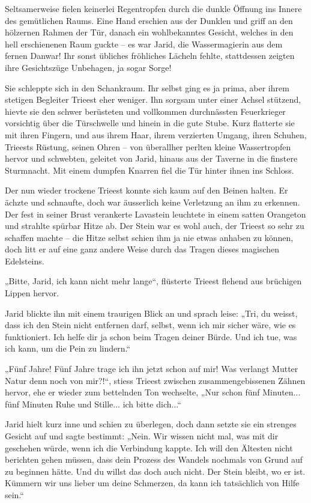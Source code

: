 Seltsamerweise fielen keinerlei Regentropfen durch die dunkle Öffnung ins Innere des gemütlichen Raums. Eine Hand erschien aus der Dunklen und griff an den hölzernen Rahmen der Tür, danach ein wohlbekanntes Gesicht, welches in den hell erschienenen Raum guckte – es war Jarid, die Wassermagierin aus dem fernen Danwar! Ihr sonst übliches fröhliches Lächeln fehlte, stattdessen zeigten ihre Gesichtszüge Unbehagen, ja sogar Sorge!

Sie schleppte sich in den Schankraum. Ihr selbst ging es ja prima, aber ihrem stetigen Begleiter Trieest eher weniger. Ihn sorgsam unter einer Achsel stützend, hievte sie den schwer berüsteten und vollkommen durchnässten Feuerkrieger vorsichtig über die Türschwelle und hinein in die gute Stube. Kurz flatterte sie mit ihren Fingern, und aus ihrem Haar, ihrem verzierten Umgang, ihren Schuhen, Trieests Rüstung, seinen Ohren – von überallher perlten kleine Wassertropfen hervor und schwebten, geleitet von Jarid, hinaus aus der Taverne in die finstere Sturmnacht. Mit einem dumpfen Knarren fiel die Tür hinter ihnen ins Schloss.

Der nun wieder trockene Trieest konnte sich kaum auf den Beinen halten. Er ächzte und schnaufte, doch war äusserlich keine Verletzung an ihm zu erkennen. Der fest in seiner Brust verankerte Lavastein leuchtete in einem satten Orangeton und strahlte spürbar Hitze ab. Der Stein war es wohl auch, der Trieest so sehr zu schaffen machte – die Hitze selbst schien ihm ja nie etwas anhaben zu können, doch litt er auf eine ganz andere Weise durch das Tragen dieses magischen Edelsteins.

„Bitte, Jarid, ich kann nicht mehr lange“, flüsterte Trieest flehend aus brüchigen Lippen hervor.

Jarid blickte ihn mit einem traurigen Blick an und sprach leise: „Tri, du weisst, dass ich den Stein nicht entfernen darf, selbst, wenn ich mir sicher wäre, wie es funktioniert. Ich helfe dir ja schon beim Tragen deiner Bürde. Und ich tue, was ich kann, um die Pein zu lindern.“

„Fünf Jahre! Fünf Jahre trage ich ihn jetzt schon auf mir! Was verlangt Mutter Natur denn noch von mir?!“, stiess Trieest zwischen zusammengebissenen Zähnen hervor, ehe er wieder zum bettelnden Ton wechselte, „Nur schon fünf Minuten... fünf Minuten Ruhe und Stille... ich bitte dich...“

Jarid hielt kurz inne und schien zu überlegen, doch dann setzte sie ein strenges Gesicht auf und sagte bestimmt: „Nein. Wir wissen nicht mal, was mit dir geschehen würde, wenn ich die Verbindung kappte. Ich will den Ältesten nicht berichten gehen müssen, dass dein Prozess des Wandels nochmals von Grund auf zu beginnen hätte. Und du willst das doch auch nicht. Der Stein bleibt, wo er ist. Kümmern wir uns lieber um deine Schmerzen, da kann ich tatsächlich von Hilfe sein.“

